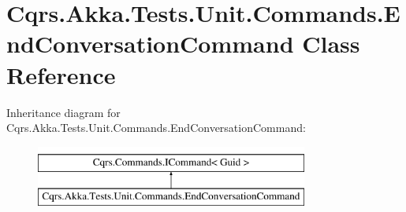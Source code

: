 \hypertarget{classCqrs_1_1Akka_1_1Tests_1_1Unit_1_1Commands_1_1EndConversationCommand}{}\section{Cqrs.\+Akka.\+Tests.\+Unit.\+Commands.\+End\+Conversation\+Command Class Reference}
\label{classCqrs_1_1Akka_1_1Tests_1_1Unit_1_1Commands_1_1EndConversationCommand}
Inheritance diagram for Cqrs.\+Akka.\+Tests.\+Unit.\+Commands.\+End\+Conversation\+Command\+:\begin{figure}[H]
\begin{center}
\leavevmode
\includegraphics[height=2.000000cm]{classCqrs_1_1Akka_1_1Tests_1_1Unit_1_1Commands_1_1EndConversationCommand}
\end{center}
\end{figure}
